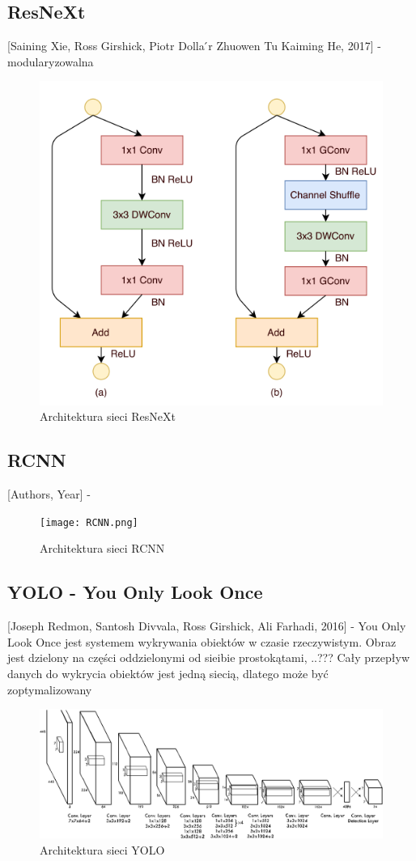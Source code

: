 \documentclass[a4paper,twoside,titlepage,openright]{book}
\begin{document}
\subsection{ResNeXt}
[Saining Xie, Ross Girshick, Piotr Dolla ́r Zhuowen Tu Kaiming He, 2017] - modularyzowalna 
\begin{figure}[h]
	\centering
			\includegraphics[resolution=120]{ResNeXt.png}
		\caption{Architektura sieci ResNeXt}
\end{figure}

\subsection{RCNN}
[Authors, Year] - 
\begin{figure}[h]
	\centering
			\texttt{[image: RCNN.png]}
		\caption{Architektura sieci RCNN}
\end{figure}

\subsection{YOLO - You Only Look Once }
[Joseph Redmon, Santosh Divvala, Ross Girshick, Ali Farhadi, 2016] - You Only Look Once jest systemem wykrywania obiektów w czasie rzeczywistym. Obraz jest dzielony na części oddzielonymi od sieibie prostokątami, ..???
Cały przepływ danych do wykrycia obiektów jest jedną siecią, dlatego może być zoptymalizowany 
\begin{figure}[h]
	\centering
			\includegraphics[resolution=120]{YOLO.png}
		\caption{Architektura sieci YOLO}
\end{figure}
\end{document}

